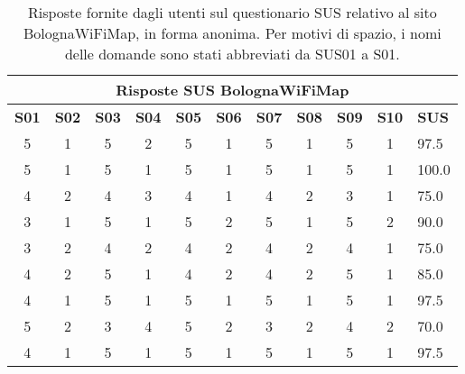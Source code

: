 \begin{center}
    \begin{table}
        \centering
        \begin{tabularx}{\textwidth}{|c|c|c|c|c|c|c|c|c|c|X|}
            \hline
            \multicolumn{11}{|c|}{\textbf{Risposte SUS BolognaWiFiMap}} \\
            \hline
            \textbf{S01} & \textbf{S02} & \textbf{S03} & \textbf{S04} & \textbf{S05} & \textbf{S06} & \textbf{S07} & \textbf{S08} & \textbf{S09} & \textbf{S10} & \textbf{SUS} \\
            \hline
            5 & 1 & 5 & 2 & 5 & 1 & 5 & 1 & 5 & 1 & 97.5 \\
            5 & 1 & 5 & 1 & 5 & 1 & 5 & 1 & 5 & 1 & 100.0 \\
            4 & 2 & 4 & 3 & 4 & 1 & 4 & 2 & 3 & 1 & 75.0 \\
            3 & 1 & 5 & 1 & 5 & 2 & 5 & 1 & 5 & 2 & 90.0 \\
            3 & 2 & 4 & 2 & 4 & 2 & 4 & 2 & 4 & 1 & 75.0 \\
            4 & 2 & 5 & 1 & 4 & 2 & 4 & 2 & 5 & 1 & 85.0 \\
            4 & 1 & 5 & 1 & 5 & 1 & 5 & 1 & 5 & 1 & 97.5 \\
            5 & 2 & 3 & 4 & 5 & 2 & 3 & 2 & 4 & 2 & 70.0 \\
            4 & 1 & 5 & 1 & 5 & 1 & 5 & 1 & 5 & 1 & 97.5 \\
            \hline
        \end{tabularx}
        \caption[Risposte del questionario SUS sul sito BolognaWiFiMap]{Risposte fornite dagli utenti sul questionario SUS relativo al sito BolognaWiFiMap, in forma anonima. Per motivi di spazio, i nomi delle domande sono stati abbreviati da SUS01 a S01.}
        \label{tab:sus_bolognawifimap}
    \end{table}
\end{center}

